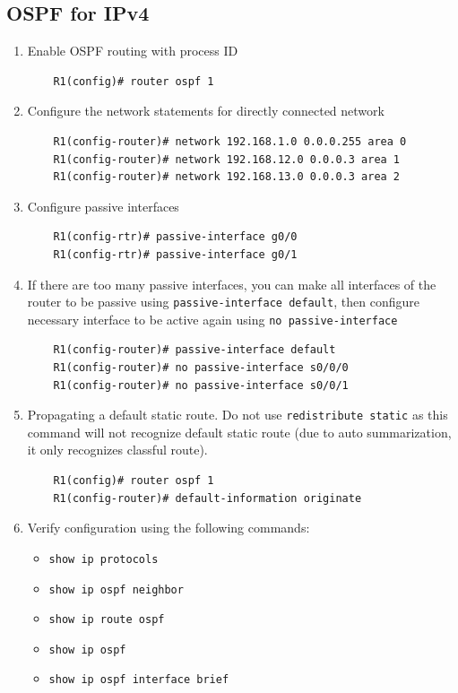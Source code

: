 \subsection{OSPF for IPv4}

\begin{enumerate}
\item Enable OSPF routing with process ID
	\begin{verbatim}
	R1(config)# router ospf 1
	\end{verbatim}
	
\item Configure the network statements for directly connected network
	\begin{verbatim}
	R1(config-router)# network 192.168.1.0 0.0.0.255 area 0 
	R1(config-router)# network 192.168.12.0 0.0.0.3 area 1 
	R1(config-router)# network 192.168.13.0 0.0.0.3 area 2
	\end{verbatim}
	
\item Configure passive interfaces
	\begin{verbatim} 
	R1(config-rtr)# passive-interface g0/0 
	R1(config-rtr)# passive-interface g0/1
	\end{verbatim}	

\item If there are too many passive interfaces, you can make all interfaces of the router to be passive using \verb|passive-interface default|, then configure necessary interface to be active again using \verb|no passive-interface|
	\begin{verbatim}
	R1(config-router)# passive-interface default
	R1(config-router)# no passive-interface s0/0/0
	R1(config-router)# no passive-interface s0/0/1
	\end{verbatim}		
	
\item Propagating a default static route. \note Do not use \verb|redistribute static| as this command will not recognize default static route (due to auto summarization, it only recognizes classful route).
	\begin{verbatim}
	R1(config)# router ospf 1
	R1(config-router)# default-information originate
	\end{verbatim}
	
\item Verify configuration using the following commands:
	\begin{itemize}
	\item \verb|show ip protocols|
	\item \verb|show ip ospf neighbor|
	\item \verb|show ip route ospf|
	\item \verb|show ip ospf|
	\item \verb|show ip ospf interface brief|
	\end{itemize}		
\end{enumerate}

